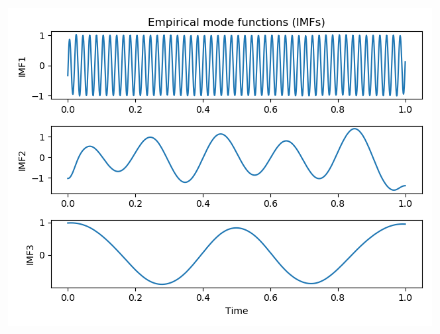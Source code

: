 \documentclass[../Main/thesis.tex]{subfiles}
\begin{document}
\begin{figure}[H]
	\centering
	\includegraphics[width=0.8\linewidth]{../fig/signal_imfs}
	\caption{}
	\label{fig:signalimfs}
\end{figure}
\end{document}
